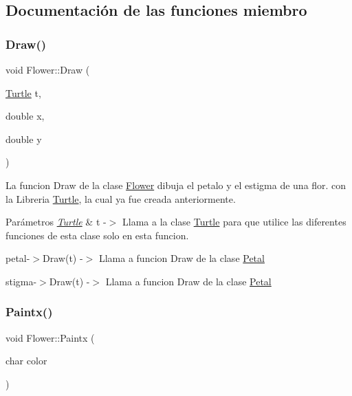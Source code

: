 \subsection{Documentación de las funciones miembro}
\mbox{\label{class_flower_aa25ad2aeb15804fa1f7bc0064ae0e8f1}} 
\subsubsection{\texorpdfstring{Draw()}{Draw()}}
{\footnotesize\ttfamily void Flower\+::\+Draw (\begin{DoxyParamCaption}\item[{\mbox{\hyperlink{class_turtle}{Turtle}}}]{t,  }\item[{double}]{x,  }\item[{double}]{y }\end{DoxyParamCaption})\hspace{0.3cm}{\ttfamily [inline]}}



La funcion Draw de la clase \mbox{\hyperlink{class_flower}{Flower}} dibuja el petalo y el estigma de una flor. con la Libreria \mbox{\hyperlink{class_turtle}{Turtle}}, la cual ya fue creada anteriormente. 


\begin{DoxyParams}{Parámetros}
{\em \mbox{\hyperlink{class_turtle}{Turtle}}} & t -\/$>$ Llama a la clase \mbox{\hyperlink{class_turtle}{Turtle}} para que utilice las diferentes funciones de esta clase solo en esta funcion. \\
\hline
\end{DoxyParams}
petal-\/$>$Draw(t) -\/$>$ Llama a funcion Draw de la clase \mbox{\hyperlink{class_petal}{Petal}}

stigma-\/$>$Draw(t) -\/$>$ Llama a funcion Draw de la clase \mbox{\hyperlink{class_petal}{Petal}} \mbox{\label{class_flower_a63947d23866ea55e132c1744caf63b19}} 
\subsubsection{\texorpdfstring{Paintx()}{Paintx()}}
{\footnotesize\ttfamily void Flower\+::\+Paintx (\begin{DoxyParamCaption}\item[{char}]{color }\end{DoxyParamCaption})\hspace{0.3cm}{\ttfamily [inline]}}



